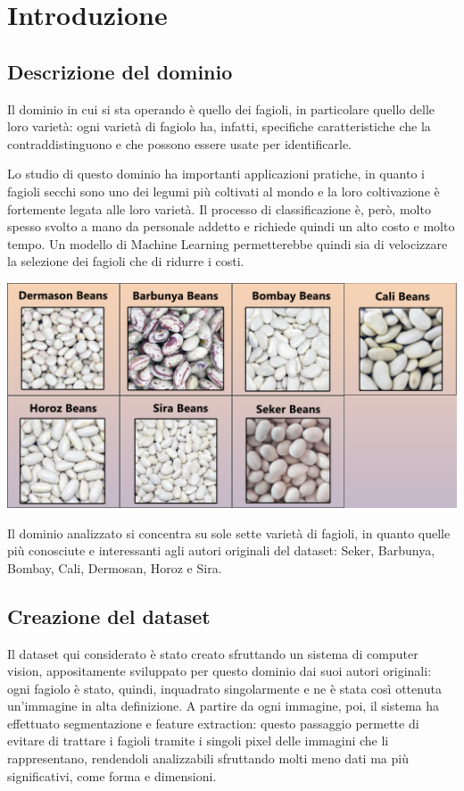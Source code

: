 \section{Introduzione}
\subsection{Descrizione del dominio}
Il dominio in cui si sta operando è quello dei fagioli, in particolare quello
delle loro varietà: ogni varietà di fagiolo ha, infatti, specifiche
caratteristiche che la contraddistinguono e che possono essere usate per
identificarle.

Lo studio di questo dominio ha importanti applicazioni pratiche, in 
quanto i fagioli secchi sono uno dei legumi più coltivati al mondo e la loro
coltivazione è fortemente legata alle loro varietà. 
Il processo di classificazione è, però, molto spesso svolto a mano 
da personale addetto e richiede quindi un alto costo e molto tempo.
Un modello di Machine Learning permetterebbe
quindi sia di velocizzare la selezione dei fagioli che di ridurre i costi.

\begin{Figure}
    \centering
    \includegraphics[width=\linewidth]{img/dry_beans.png}
\end{Figure}

Il dominio analizzato si concentra su sole sette varietà di fagioli, in quanto
quelle più conosciute e interessanti agli autori originali del dataset:
Seker, Barbunya, Bombay, Cali, Dermosan, Horoz e Sira.

\subsection{Creazione del dataset}
Il dataset \cite{dry_bean_dataset} qui considerato è stato creato sfruttando un
sistema di computer vision, appositamente sviluppato per questo dominio
dai suoi autori originali: ogni fagiolo è stato, quindi, inquadrato 
singolarmente e ne è stata così ottenuta un'immagine in alta definizione.
A partire da ogni immagine, poi, il sistema ha effettuato segmentazione
e feature extraction: questo passaggio permette di evitare di trattare
i fagioli tramite i singoli pixel delle immagini che li rappresentano,
rendendoli analizzabili sfruttando molti meno dati ma più significativi,
come forma e dimensioni.